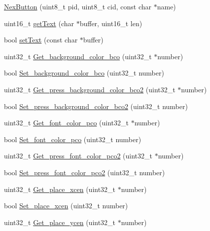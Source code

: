\begin{DoxyCompactItemize}
\item 
\hyperlink{class_nex_button_a57d346614059bac40aff955a0dc9d76a}{Nex\+Button} (uint8\+\_\+t pid, uint8\+\_\+t cid, const char $\ast$name)
\item 
uint16\+\_\+t \hyperlink{class_nex_button_a5ba1f74aa94b41b98172e42583ee13d6}{get\+Text} (char $\ast$buffer, uint16\+\_\+t len)
\item 
bool \hyperlink{class_nex_button_a649dafc5afb1dc7f1fc1bde1e6270290}{set\+Text} (const char $\ast$buffer)
\item 
uint32\+\_\+t \hyperlink{class_nex_button_a85eb673a290ee35f3a73e9b02193fc70}{Get\+\_\+background\+\_\+color\+\_\+bco} (uint32\+\_\+t $\ast$number)
\item 
bool \hyperlink{class_nex_button_ae6ade99045d0f97594eac50adc7c12f7}{Set\+\_\+background\+\_\+color\+\_\+bco} (uint32\+\_\+t number)
\item 
uint32\+\_\+t \hyperlink{class_nex_button_abb5a765ca9079944757480a9fda1a6ac}{Get\+\_\+press\+\_\+background\+\_\+color\+\_\+bco2} (uint32\+\_\+t $\ast$number)
\item 
bool \hyperlink{class_nex_button_acdc1da7ffea8791a8237b201d572d1e3}{Set\+\_\+press\+\_\+background\+\_\+color\+\_\+bco2} (uint32\+\_\+t number)
\item 
uint32\+\_\+t \hyperlink{class_nex_button_a51b1b698696d7d4969ebb21754bb7e4d}{Get\+\_\+font\+\_\+color\+\_\+pco} (uint32\+\_\+t $\ast$number)
\item 
bool \hyperlink{class_nex_button_a9fbfe6df7a285e470fb8bc3fd77df00a}{Set\+\_\+font\+\_\+color\+\_\+pco} (uint32\+\_\+t number)
\item 
uint32\+\_\+t \hyperlink{class_nex_button_a970789126a0781810f499ae064fed942}{Get\+\_\+press\+\_\+font\+\_\+color\+\_\+pco2} (uint32\+\_\+t $\ast$number)
\item 
bool \hyperlink{class_nex_button_a5fe5e3331795ecb43eacf5aead7f5f4a}{Set\+\_\+press\+\_\+font\+\_\+color\+\_\+pco2} (uint32\+\_\+t number)
\item 
uint32\+\_\+t \hyperlink{class_nex_button_ab970c6e27b5d1d9082b0b3bf47ed9d47}{Get\+\_\+place\+\_\+xcen} (uint32\+\_\+t $\ast$number)
\item 
bool \hyperlink{class_nex_button_a76cdf6324e05d7a2c30f397e947e7cc7}{Set\+\_\+place\+\_\+xcen} (uint32\+\_\+t number)
\item 
uint32\+\_\+t \hyperlink{class_nex_button_aea0a8ea4e9a28ae3769414f2532483e9}{Get\+\_\+place\+\_\+ycen} (uint32\+\_\+t $\ast$number)

\end{DoxyCompactItemize}
